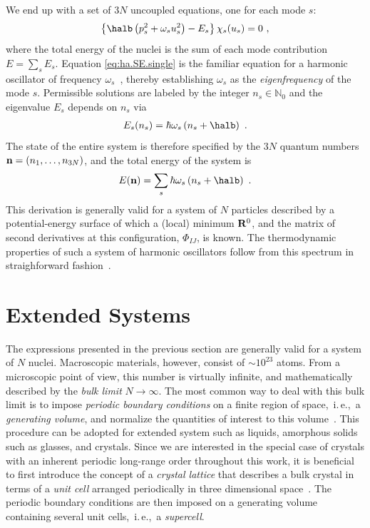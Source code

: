 We end up with a set of $3N$ uncoupled equations, one for each mode $s$:
\begin{align}
	\left\{	\halb \left( p_s^2 + \omega_s u_s^2 \right)	- E_s	\right\} \chi_s (u_s)
		= 0~,
	\label{eq:ha.SE.single}
\end{align}
where the total energy of the nuclei is the sum of each mode contribution $E = \sum_s E_s$. Equation \eqref{eq:ha.SE.single} is the familiar equation for a harmonic oscillator of frequency $\omega_s$~\cite{Dirac1981}, thereby establishing $\omega_s$ as the \emph{eigenfrequency} of the mode $s$. Permissible solutions are labeled by the integer $n_s \in \mathds N_0$ and the eigenvalue $E_s$ depends on $n_s$ via
\begin{align}
	E_s(n_s) = \hbar \omega_s \left( n_s + \halb \right)~.
	\label{eq:E_s}
\end{align}
The state of the entire system is therefore specified by the $3N$ quantum numbers ${\bf n} = (n_1, \ldots, n_{3N})$, and the total energy of the system is
\begin{align}
	E ({\bf n}) = \sum_s \hbar \omega_s \left( n_s + \halb \right)~.
\end{align}
This derivation is generally valid for a system of $N$ particles described by a potential-energy surface of which a (local) minimum ${\bf R}^0$, and the matrix of second derivatives at this configuration, $\Phi_{IJ}$, is known. The thermodynamic properties of such a system of harmonic oscillators follow from this spectrum in straighforward fashion~\cite{BornHuang}.

\newpage

\section{Extended Systems}
\label{sec:extended_systems}
The expressions presented in the previous section are generally valid for a system of $N$ nuclei. Macroscopic materials, however, consist of $\sim 10^{23}$ atoms. From a microscopic point of view, this number is virtually infinite, and mathematically described by the \emph{bulk limit} $N \to \infty$. The most common way to deal with this bulk limit is to impose \emph{periodic boundary conditions} on a finite region of space,~i.\,e.,~a \emph{generating volume}, and normalize the quantities of interest to this volume~\cite{BornHuang}. This procedure can be adopted for extended system such as liquids, amorphous solids such as glasses, and crystals. Since we are interested in the special case of crystals with an inherent periodic long-range order throughout this work, it is beneficial to first introduce the concept of a \emph{crystal lattice} that describes a bulk crystal in terms of a \emph{unit cell} arranged periodically in three dimensional space~\cite{Sands1969}. The periodic boundary conditions are then imposed on a generating volume containing several unit cells,~i.\,e.,~a \emph{supercell}.

